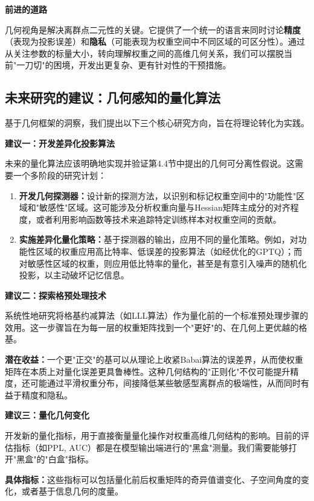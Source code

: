 \documentclass[letterpaper,twocolumn,10pt]{article}
\begin{document}
\textbf{前进的道路}

几何视角是解决离群点二元性的关键。它提供了一个统一的语言来同时讨论\textbf{精度}（表现为投影误差）和\textbf{隐私}（可能表现为权重空间中不同区域的可区分性）。通过从关注参数的标量大小，转向理解权重之间的高维几何关系，我们可以摆脱当前"一刀切"的困境，开发出更复杂、更有针对性的干预措施。

\subsection{未来研究的建议：几何感知的量化算法}

基于几何框架的洞察，我们提出以下三个核心研究方向，旨在将理论转化为实践。

\textbf{建议一：开发差异化投影算法}

未来的量化算法应该明确地实现并验证第4.4节中提出的几何可分离性假说。这需要一个多阶段的研究计划：

\begin{enumerate}
\item \textbf{开发几何探测器：}设计新的探测方法，以识别和标记权重空间中的"功能性"区域和"敏感性"区域。这可能涉及分析权重向量与Hessian矩阵主成分的对齐程度，或者利用影响函数等技术来追踪特定训练样本对权重空间的贡献。
\item \textbf{实施差异化量化策略：}基于探测器的输出，应用不同的量化策略。例如，对功能性区域的权重应用高比特率、低误差的投影算法（如经优化的GPTQ）；而对敏感性区域的权重，则应用低比特率的量化，甚至是有意引入噪声的随机化投影，以主动破坏记忆信息。
\end{enumerate}

\textbf{建议二：探索格预处理技术}

系统性地研究将格基约减算法（如LLL算法）作为量化前的一个标准预处理步骤的效用。这一步骤旨在为每一层的权重矩阵找到一个"更好"的、在几何上更优越的格基。

\textbf{潜在收益：}一个更"正交"的基可以从理论上收紧Babai算法的误差界，从而使权重矩阵在本质上对量化误差更具鲁棒性。这种几何结构的"正则化"不仅可能提升精度，还可能通过平滑权重分布，间接降低某些敏感型离群点的极端性，从而同时有益于精度和隐私。

\textbf{建议三：量化几何变化}

开发新的量化指标，用于直接衡量量化操作对权重高维几何结构的影响。目前的评估指标（如PPL, AUC）都是在模型输出端进行的"黑盒"测量。我们需要能够打开"黑盒"的"白盒"指标。

\textbf{具体指标：}这些指标可以包括量化前后权重矩阵的奇异值谱变化、子空间角度的变化，或者基于信息几何的度量。
\end{document}

